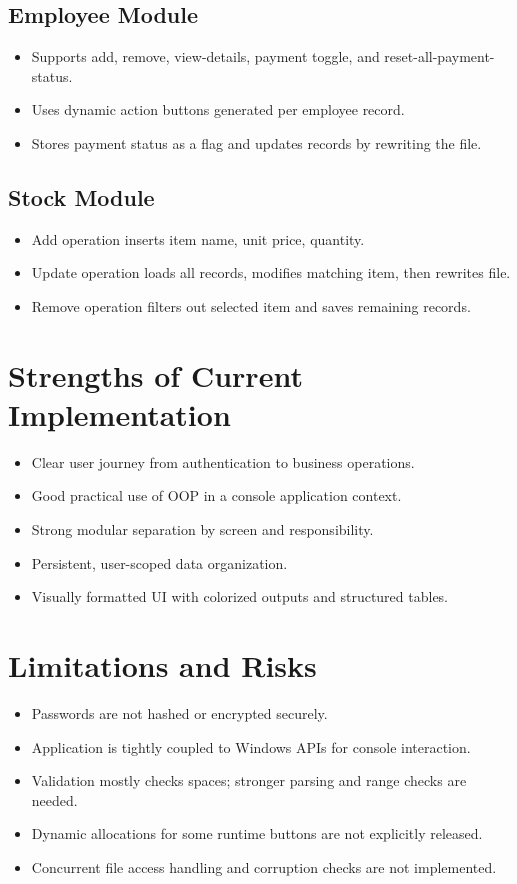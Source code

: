 \documentclass[12pt,a4paper]{article}
\begin{document}
\subsection{Employee Module}
\begin{itemize}[leftmargin=1.4em]
    \item Supports add, remove, view-details, payment toggle, and reset-all-payment-status.
    \item Uses dynamic action buttons generated per employee record.
    \item Stores payment status as a flag and updates records by rewriting the file.
\end{itemize}

\subsection{Stock Module}
\begin{itemize}[leftmargin=1.4em]
    \item Add operation inserts item name, unit price, quantity.
    \item Update operation loads all records, modifies matching item, then rewrites file.
    \item Remove operation filters out selected item and saves remaining records.
\end{itemize}

\section{Strengths of Current Implementation}
\begin{itemize}[leftmargin=1.4em]
    \item Clear user journey from authentication to business operations.
    \item Good practical use of OOP in a console application context.
    \item Strong modular separation by screen and responsibility.
    \item Persistent, user-scoped data organization.
    \item Visually formatted UI with colorized outputs and structured tables.
\end{itemize}

\section{Limitations and Risks}
\begin{itemize}[leftmargin=1.4em]
    \item Passwords are not hashed or encrypted securely.
    \item Application is tightly coupled to Windows APIs for console interaction.
    \item Validation mostly checks spaces; stronger parsing and range checks are needed.
    \item Dynamic allocations for some runtime buttons are not explicitly released.
    \item Concurrent file access handling and corruption checks are not implemented.
\end{itemize}
\end{document}
